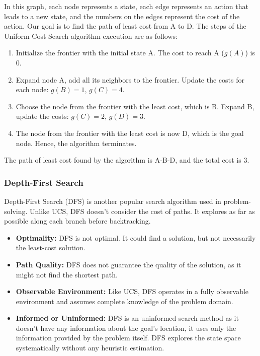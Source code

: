 \documentclass[a4paper,UKenglish,cleveref, autoref, thm-restate]{qlinhta}
\begin{document}
    In this graph, each node represents a state, each edge represents an action that leads to a new state, and the numbers on the edges represent the cost of the action. Our goal is to find the path of least cost from A to D. The steps of the Uniform Cost Search algorithm execution are as follows:

    \begin{enumerate}
        \item Initialize the frontier with the initial state A. The cost to reach A ($g(A)$) is 0.
        \item Expand node A, add all its neighbors to the frontier. Update the costs for each node: $g(B) = 1$, $g(C) = 4$.
        \item Choose the node from the frontier with the least cost, which is B. Expand B, update the costs: $g(C) = 2$, $g(D) = 3$.
        \item The node from the frontier with the least cost is now D, which is the goal node. Hence, the algorithm terminates.
    \end{enumerate}

    The path of least cost found by the algorithm is A-B-D, and the total cost is 3.

    \subsubsection{Depth-First Search}

    Depth-First Search (DFS) is another popular search algorithm used in problem-solving. Unlike UCS, DFS doesn't consider the cost of paths. It explores as far as possible along each branch before backtracking.

    \begin{itemize}
        \item \textbf{Optimality:} DFS is not optimal. It could find a solution, but not necessarily the least-cost solution.
        \item \textbf{Path Quality:} DFS does not guarantee the quality of the solution, as it might not find the shortest path.
        \item \textbf{Observable Environment:} Like UCS, DFS operates in a fully observable environment and assumes complete knowledge of the problem domain.
        \item \textbf{Informed or Uninformed:} DFS is an uninformed search method as it doesn't have any information about the goal's location, it uses only the information provided by the problem itself. DFS explores the state space systematically without any heuristic estimation.
    \end{itemize}
\end{document}
